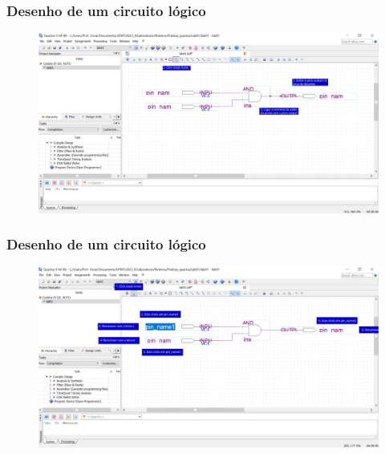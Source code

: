 \documentclass{CPSPresentation}
\begin{document}
\begin{frame}
	\frametitle{Desenho de um circuito lógico}
	
	
	\begin{figure}[h]
		\centering
		\includegraphics[width=1.02\textwidth]{quartus/fig14.pdf}
	\end{figure}
	
	
\end{frame}
\begin{frame}
	\frametitle{Desenho de um circuito lógico}
	
	
	
	
	\begin{figure}[h]
		\centering
		\includegraphics[width=1.02\textwidth]{quartus/fig15.pdf}
	\end{figure}
	
	
\end{frame}
\end{document}
